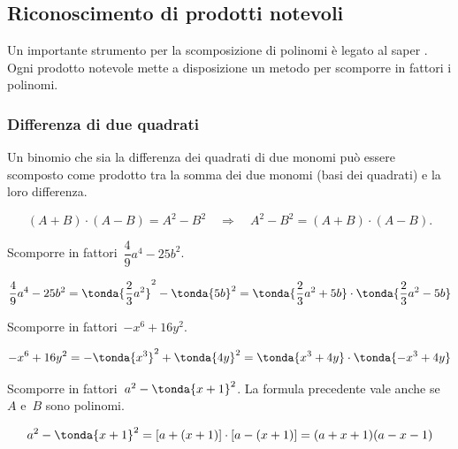 % 


\subsection{Riconoscimento di prodotti notevoli}
\label{subsec:divpol_prodnot}

Un importante strumento per la scomposizione di polinomi è legato al 
saper .
Ogni prodotto notevole mette a disposizione un metodo per scomporre 
in fattori i polinomi.

\subsubsection{Differenza di due quadrati}
\label{subsubsec:divpol_difquad}

Un binomio che sia la differenza dei quadrati di due monomi può essere 
scomposto come prodotto tra la somma dei due monomi (basi dei quadrati) 
e la loro differenza.

\vspace{-1.0em}
\begin{equation*}
(A+B)\cdot (A-B)=
A^{2}-B^{2}\quad \Rightarrow \quad A^{2}-B^{2}=(A+B)\cdot (A-B).
\end{equation*}

\begin{esempio}{}{}
Scomporre in fattori~\(\dfrac{4}{9}a^{4}-25b^{2}\).

\vspace{-1.0em}
\[\dfrac{4}{9}a^{4}-25b^{2}=
  \tonda{\dfrac{2}{3}a^{2}}^{2}-\tonda{5b}^{2}=
  \tonda{\dfrac{2}{3}a^{2}+5b}\cdot \tonda{\dfrac{2}{3}a^{{2}}-5b}\]
\end{esempio}

\begin{esempio}{}{}
Scomporre in fattori~\(-x^6+16y^{2}\).

\vspace{-1.0em}
\[-x^6+16y^{2}=-\tonda{x^3}^{2}+\tonda{4y}^{2}=
  \tonda{x^3+4y}\cdot \tonda{-x^3+4y}\]
\end{esempio}

\begin{esempio}{}{}
Scomporre in fattori~\(a^{2}-\tonda{x+1}^{2}\).
La formula precedente vale anche se~\(A\) e~\(B\) sono polinomi. 

\vspace{-1.0em}
\[a^{2}-\tonda{x+1}^{2}=
 \left[a+(x+1)\right]\cdot \left[a-(x+1)\right]=(a+x+1)(a-x-1)\]
\end{esempio}

